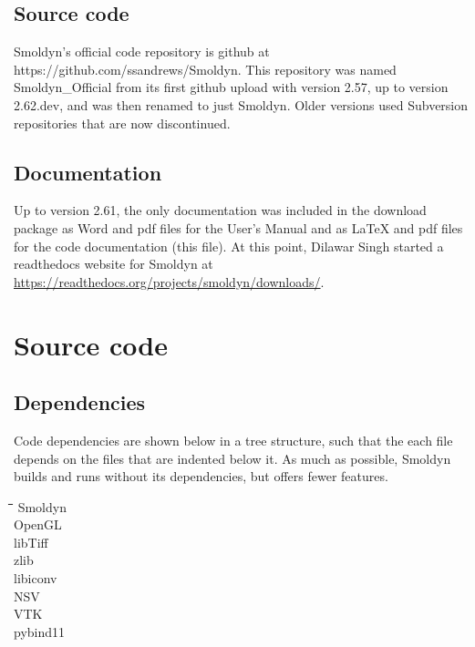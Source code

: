 \documentclass {book}
\begin{document}
\subsection{Source code}

Smoldyn's official code repository is github at https://github.com/ssandrews/Smoldyn. This repository was named Smoldyn\_Official from its first github upload with version 2.57, up to version 2.62.dev, and was then renamed to just Smoldyn. Older versions used Subversion repositories that are now discontinued.

\subsection{Documentation}

Up to version 2.61, the only documentation was included in the download package as Word and pdf files for the User's Manual and as LaTeX and pdf files for the code documentation (this file). At this point, Dilawar Singh started a readthedocs website for Smoldyn at \url{https://readthedocs.org/projects/smoldyn/downloads/}.


\section{Source code}

\subsection{Dependencies}

Code dependencies are shown below in a tree structure, such that the each file depends on the files that are indented below it. As much as possible, Smoldyn builds and runs without its dependencies, but offers fewer features.

\begin{tabbing}
\hspace{0.25in}\=\hspace{0.25in}\=\hspace{0.25in}\=\hspace{0.25in}\=\hspace{0.25in}\=\kill
\>Smoldyn\\
\>\>OpenGL\\
\>\>libTiff\\
\>\>zlib\\
\>\>libiconv\\
\>\>NSV\\
\>\>\>VTK\\
\>\>pybind11\\
\end{tabbing}
\end{document}
